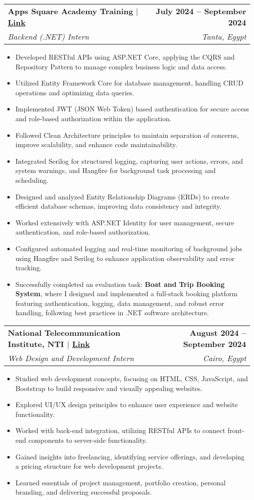 \documentclass[letterpaper,11pt]{article}
\makeatletter
\newcommand{\resumeItem}[1]{
  \item\small{
    {#1 \vspace{-2pt}}
  }
}
\newcommand{\resumeSubheading}[4]{
  \vspace{-2pt}\item
    \begin{tabular*}{1.0\textwidth}[t]{l@{\extracolsep{\fill}}r}
      \textbf{#1} & \textbf{\small #2} \\
      \textit{\small#3} & \textit{\small #4} \\
    \end{tabular*}\vspace{-7pt}
}
\newcommand{\resumeItemListStart}{\begin{itemize}}
\newcommand{\resumeItemListEnd}{\end{itemize}\vspace{-5pt}}
\makeatother
\begin{document}
  \resumeSubheading
  {Apps Square Academy Training $|$ \hspace{5pt} \textcolor{blue}{\href{https://drive.google.com/file/d/1TZwE-7JMcJ-a1B46s2ioIn3uSYnJayZx/view?usp=drive_link}{Link}}}{July 2024 -- September 2024}
  {Backend (.NET) Intern}{Tanta, Egypt}
    \resumeItemListStart
      \resumeItem{Developed RESTful APIs using ASP.NET Core, applying the CQRS and Repository Pattern to manage complex business logic and data access.}
      \resumeItem{Utilized Entity Framework Core for database management, handling CRUD operations and optimizing data queries.}
      \resumeItem{Implemented JWT (JSON Web Token) based authentication for secure access and role-based authorization within the application.}
      \resumeItem{Followed Clean Architecture principles to maintain separation of concerns, improve scalability, and enhance code maintainability.}
      \resumeItem{Integrated Serilog for structured logging, capturing user actions, errors, and system warnings, and Hangfire for background task processing and scheduling.}
      \resumeItem{Designed and analyzed Entity Relationship Diagrams (ERDs) to create efficient database schemas, improving data consistency and integrity.}
      \resumeItem{Worked extensively with ASP.NET Identity for user management, secure authentication, and role-based authorization.}
      \resumeItem{Configured automated logging and real-time monitoring of background jobs using Hangfire and Serilog to enhance application observability and error tracking.}
      \resumeItem{Successfully completed an evaluation task: \textbf{Boat and Trip Booking System}, where I designed and implemented a full-stack booking platform featuring authentication, logging, data management, and robust error handling, following best practices in .NET software architecture.}
    \resumeItemListEnd

  \resumeSubheading
  {National Telecommunication Institute, NTI $|$ \hspace{5pt} \textcolor{blue}{\href{https://drive.google.com/file/d/1lvcHiExjEDObHDEzapaIxWdP3OGyv8nf/view?usp=drive_link}{Link}}}{August 2024 -- September 2024}
    {Web Design and Development Intern}{Cairo, Egypt}
    \resumeItemListStart
      \resumeItem{Studied web development concepts, focusing on HTML, CSS, JavaScript, and Bootstrap to build responsive and visually appealing websites.}
      \resumeItem{Explored UI/UX design principles to enhance user experience and website functionality.}
      \resumeItem{Worked with back-end integration, utilizing RESTful APIs to connect front-end components to server-side functionality.}
      \resumeItem{Gained insights into freelancing, identifying service offerings, and developing a pricing structure for web development projects.}
      \resumeItem{Learned essentials of project management, portfolio creation, personal branding, and delivering successful proposals.}
    \resumeItemListEnd
\end{document}

